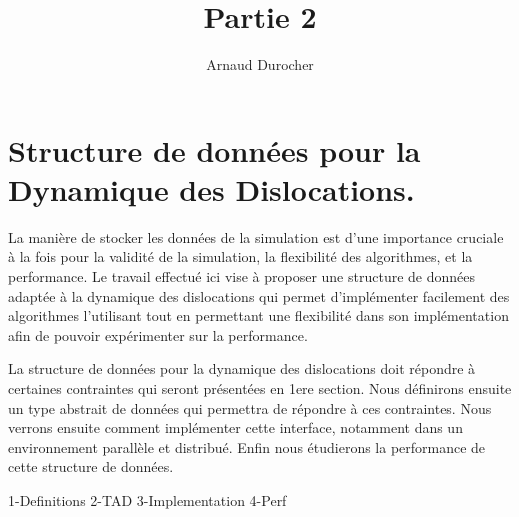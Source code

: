 \documentclass[11pt,class=article,float=false,crop=false]{standalone}
\title{ Partie 2 }
\author{Arnaud Durocher}
\begin{document}
	
\onlyifstandalone{\maketitle}
\onlyifstandalone{\tableofcontents}
\onlyifstandalone{\listoftodos}

\part{Structure de données pour la Dynamique des Dislocations.}

La manière de stocker les données de la simulation est d'une importance cruciale à la fois pour la validité de la simulation, la flexibilité des algorithmes, et la performance. Le travail effectué ici vise à proposer une structure de données adaptée à la dynamique des dislocations qui permet d'implémenter facilement des algorithmes l'utilisant tout en permettant une flexibilité dans son implémentation afin de pouvoir expérimenter sur la performance.

La structure de données pour la dynamique des dislocations doit répondre à certaines contraintes qui seront présentées en 1ere section. Nous définirons ensuite un type abstrait de données qui permettra de répondre à ces contraintes. Nous verrons ensuite comment implémenter cette interface, notamment dans un environnement parallèle et distribué. Enfin nous étudierons la performance de cette structure de données.

{1-Definitions}
{2-TAD}
{3-Implementation}
{4-Perf}


\end{document}
